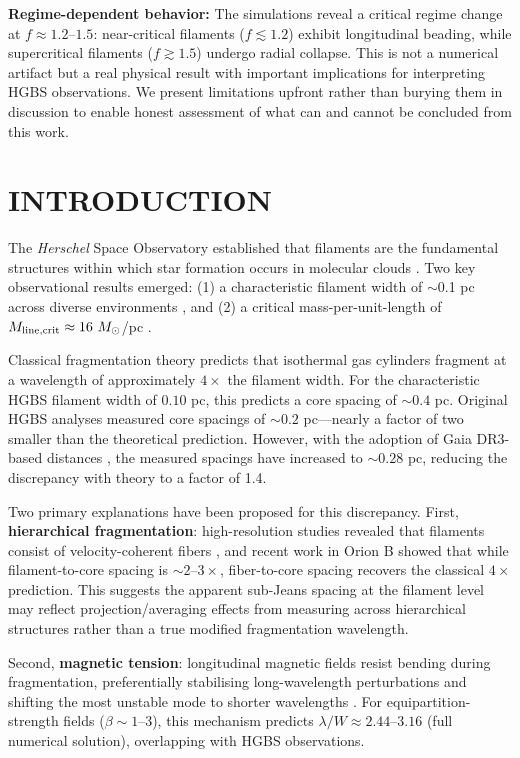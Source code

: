 \documentclass[twoside,twocolumn]{mnras}
\begin{document}
\textbf{Regime-dependent behavior:} The simulations reveal a critical regime change at $f \approx 1.2$--$1.5$: near-critical filaments ($f \lesssim 1.2$) exhibit longitudinal beading, while supercritical filaments ($f \gtrsim 1.5$) undergo radial collapse. This is not a numerical artifact but a real physical result with important implications for interpreting HGBS observations. We present limitations upfront rather than burying them in discussion to enable honest assessment of what can and cannot be concluded from this work.

\section{INTRODUCTION}

The \textit{Herschel} Space Observatory established that filaments are the fundamental structures within which star formation occurs in molecular clouds \citep{Andre2010}. Two key observational results emerged: (1) a characteristic filament width of $\sim$0.1 pc across diverse environments \citep{Arzoumanian2011}, and (2) a critical mass-per-unit-length of $M_{\rm line,crit} \approx 16~M_\odot$/pc \citep{Ostriker1964}.

Classical fragmentation theory \citep{Inutsuka1992} predicts that isothermal gas cylinders fragment at a wavelength of approximately $4\times$ the filament width. For the characteristic HGBS filament width of $0.10$ pc, this predicts a core spacing of $\sim0.4$ pc. Original HGBS analyses measured core spacings of $\sim0.2$ pc—nearly a factor of two smaller than the theoretical prediction. However, with the adoption of Gaia DR3-based distances \citep{Zhang2023}, the measured spacings have increased to $\sim0.28$ pc, reducing the discrepancy with theory to a factor of 1.4.

Two primary explanations have been proposed for this discrepancy. First, \textbf{hierarchical fragmentation}: high-resolution studies revealed that filaments consist of velocity-coherent fibers \citep{Hacar2013}, and recent work in Orion B \citep{Yang2024} showed that while filament-to-core spacing is $\sim2$--$3\times$, fiber-to-core spacing recovers the classical $4\times$ prediction. This suggests the apparent sub-Jeans spacing at the filament level may reflect projection/averaging effects from measuring across hierarchical structures rather than a true modified fragmentation wavelength.

Second, \textbf{magnetic tension}: longitudinal magnetic fields resist bending during fragmentation, preferentially stabilising long-wavelength perturbations and shifting the most unstable mode to shorter wavelengths \citep{Nakamura1993}. For equipartition-strength fields ($\beta \sim 1$--$3$), this mechanism predicts $\lambda/W \approx 2.44$--$3.16$ (full numerical solution), overlapping with HGBS observations.
\end{document}
